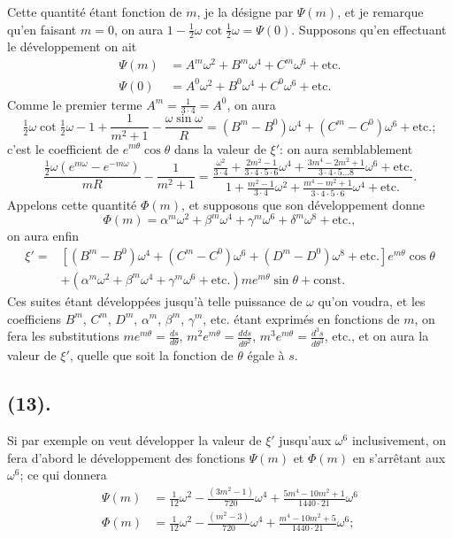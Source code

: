 \documentclass{article}
\begin{document}
Cette quantité étant fonction de $m$, je la désigne par $\Psi(m)$, et je remarque qu'en faisant $m=0$, on aura $1-\frac{1}{2}\omega\cot\frac{1}{2}\omega=\Psi(0)$. Supposons qu'en effectuant le développement on ait
\[ \begin{aligned} \Psi(m)&=A^{m}\omega^{2}+B^{m}\omega^{4}+C^{m}\omega^{6}+\text{etc.}\\ \Psi(0)&=A^{0}\omega^{2}+B^{0}\omega^{4}+C^{0}\omega^{6}+\text{etc.} \end{aligned} \]
Comme le premier terme $A^{m}=\frac{1}{3\cdot4}=A^{0}$, on aura
\[ \tfrac{1}{2}\omega\cot\tfrac{1}{2}\omega-1+\frac{1}{m^{2}+1}-\frac{\omega\sin\omega}{R}=(B^{m}-B^{0})\omega^{4}+(C^{m}-C^{0})\omega^{6}+\text{etc.}; \]
c'est le coefficient de $e^{m\theta}\cos\theta$ dans la valeur de $\xi'$: on aura semblablement
\[ \frac{\frac{1}{2}\omega(e^{m\omega}-e^{-m\omega})}{mR}-\frac{1}{m^{2}+1}=\frac{\frac{\omega^{2}}{3\cdot4}+\frac{2m^{2}-1}{3\cdot4\cdot5\cdot6}\omega^{4}+\frac{3m^{4}-2m^{2}+1}{3\cdot4\cdot5\ldots8}\omega^{6}+\text{etc.}}{1+\frac{m^{2}-1}{3\cdot4}\omega^{2}+\frac{m^{4}-m^{2}+1}{3\cdot4\cdot5\cdot6}\omega^{4}+\text{etc.}}. \]
Appelons cette quantité $\Phi(m)$, et supposons que son développement donne
\[ \Phi(m)=\alpha^{m}\omega^{2}+\beta^{m}\omega^{4}+\gamma^{m}\omega^{6}+\delta^{m}\omega^{8}+\text{etc.}, \]
on aura enfin
\[ \begin{aligned} \xi'={}&[(B^{m}-B^{0})\omega^{4}+(C^{m}-C^{0})\omega^{6}+(D^{m}-D^{0})\omega^{8}+\text{etc.}]e^{m\theta}\cos\theta\\ &+(\alpha^{m}\omega^{2}+\beta^{m}\omega^{4}+\gamma^{m}\omega^{6}+\text{etc.})me^{m\theta}\sin\theta+\text{const.} \end{aligned} \]
Ces suites étant développées jusqu'à telle puissance de $\omega$ qu'on voudra, et les coefficiens $B^{m}$, $C^{m}$, $D^{m}$, $\alpha^{m}$, $\beta^{m}$, $\gamma^{m}$, etc. étant exprimés en fonctions de $m$, on fera les substitutions $me^{m\theta}=\frac{ds}{d\theta}$, $m^{2}e^{m\theta}=\frac{dds}{d\theta^{2}}$, $m^{3}e^{m\theta}=\frac{d^{3}s}{d\theta^{3}}$, etc., et on aura la valeur de $\xi'$, quelle que soit la fonction de $\theta$ égale à $s$.

\subsection*{(13).}

Si par exemple on veut développer la valeur de $\xi'$ jusqu'aux $\omega^{6}$ inclusivement, on fera d'abord le développement des fonctions $\Psi(m)$ et $\Phi(m)$ en s'arrêtant aux $\omega^{6}$; ce qui donnera
\[ \begin{aligned} \Psi(m)&=\frac{1}{12}\omega^{2}-\frac{(3m^{2}-1)}{720}\omega^{4}+\frac{5m^{4}-10m^{2}+1}{1440\cdot21}\omega^{6}\\ \Phi(m)&=\frac{1}{12}\omega^{2}-\frac{(m^{2}-3)}{720}\omega^{4}+\frac{m^{4}-10m^{2}+5}{1440\cdot21}\omega^{6}; \end{aligned} \]
\end{document}
